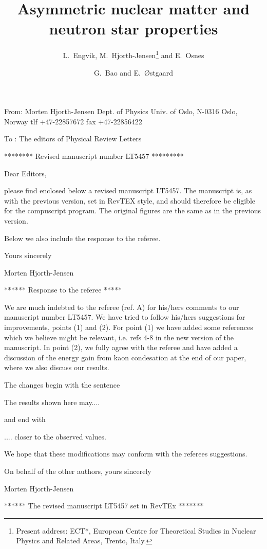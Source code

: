 
From: Morten Hjorth-Jensen
      Dept. of Physics
      Univ. of Oslo,
      N-0316 Oslo, Norway
      tlf +47-22857672
      fax +47-22856422

To : The editors of Physical Review Letters


********    Revised manuscript number LT5457   *********

Dear Editors,

please find enclosed below a revised manuscript LT5457. The manuscript
is, as with the previous version, set in RevTEX style, and should 
therefore
be eligible for the compuscript program.
The original figures are the same as in the previous version.

Below we also include the response to the referee.


Yours sincerely

Morten Hjorth-Jensen


******   Response to the referee    *****

We are much indebted to the referee (ref. A) for his/hers 
comments to our manuscript number LT5457. We have tried to follow
his/hers suggestions for improvements, points (1) and (2).
For point (1) we have added some references which we believe might
be relevant, i.e. refs 4-8 in the new version of the manuscript.
In point (2), we fully agree with the referee and have added a discussion
of the energy gain from kaon condesation at the end of our paper, where
we also discuss our results. 

The changes begin with the sentence

The results shown here may....

and end with 

.... closer to the observed values.

We hope that these modifications may conform with the 
referees suggestions.

On behalf of the other authors,
yours sincerely

Morten Hjorth-Jensen





******    The revised manuscript LT5457 set in RevTEx  *******








\draft
\title{Asymmetric nuclear matter and neutron star properties}
\author{L.\ Engvik, M.\ Hjorth-Jensen\footnote{Present address:
ECT*, European Centre for Theoretical
Studies in Nuclear Physics and Related Areas, Trento, Italy.}
and E.\ Osnes}
\address{Department of Physics,
University of Oslo, N-0316 Oslo, Norway}
\author{G.\ Bao and E.\ \O stgaard}
\address{Department of Physics, AVH,
University of Trondheim, N-7055 Dragvoll, Norway}

